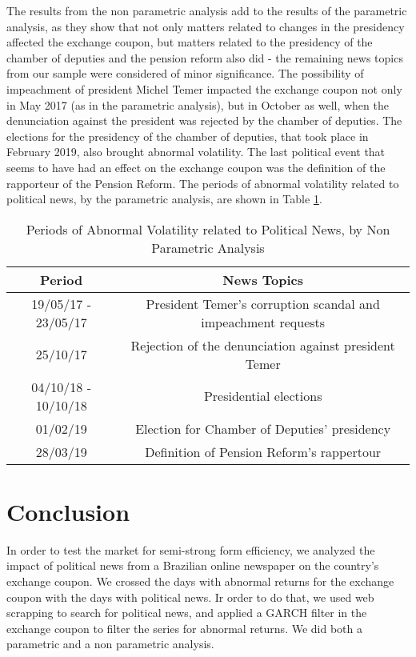 \documentclass[a4paper]{article}
\begin{document}
The results from the non parametric analysis add to the results of the parametric analysis, as they show that not only matters related to changes in the presidency affected the exchange coupon, but matters related to the presidency of the chamber of deputies and the pension reform also did - the remaining news topics from our sample were considered of minor significance. The possibility of impeachment of president Michel Temer impacted the exchange coupon not only in May 2017 (as in the parametric analysis), but in October as well, when the denunciation against the president was rejected by the chamber of deputies. The elections for the presidency of the chamber of deputies, that took place in February 2019, also brought abnormal volatility. The last political event that seems to have had an effect on the exchange coupon was the definition of the rapporteur of the Pension Reform. The periods of abnormal volatility related to political news, by the parametric analysis, are shown in Table \ref{tab:resnon}.

\begin{table}[H]
\caption{Periods of Abnormal Volatility related to Political News, by Non Parametric Analysis}
\label{tab:resnon}
\centering
\begin{tabular}{| c | c |}
\hline
Period & News Topics \\
\hline \hline
19/05/17 - 23/05/17 & President Temer's corruption scandal and impeachment requests \\
\hline
25/10/17 & Rejection of the denunciation against president Temer \\
\hline
04/10/18 - 10/10/18 & Presidential elections \\
\hline
01/02/19 & Election for Chamber of Deputies' presidency \\
\hline
28/03/19 & Definition of Pension Reform's rappertour \\
\hline
\end{tabular}
\end{table}

\section{Conclusion}

In order to test the market for semi-strong form efficiency, we analyzed the impact of political news from a Brazilian online newspaper on the country's exchange coupon. We crossed the days with abnormal returns for the exchange coupon with the days with political news. Ir order to do that, we used web scrapping to search for political news, and applied a GARCH filter in the exchange coupon to filter the series for abnormal returns. We did both a parametric and a non parametric analysis.
\end{document}
